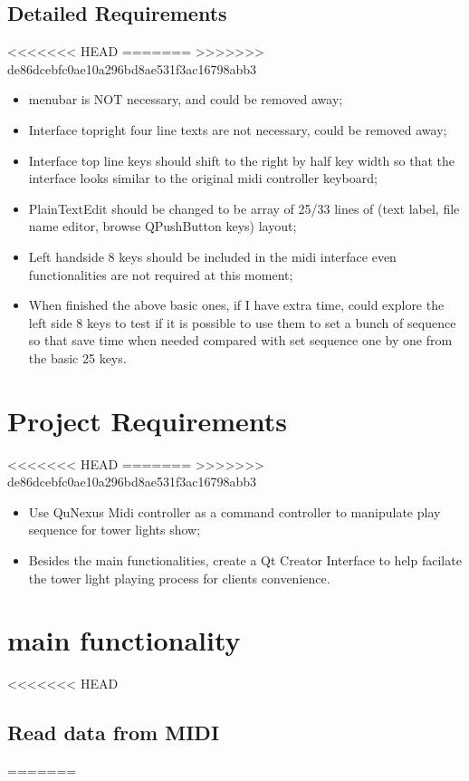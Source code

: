 \documentclass[9pt,b5paper]{article}
\begin{document}
\subsection{Detailed Requirements}
<<<<<<< HEAD
\label{sec-11-2}
=======
\label{sec-10-2}
>>>>>>> de86dcebfc0ae10a296bd8ae531f3ac16798abb3
\begin{itemize}
\item menubar is NOT necessary, and could be removed away;
\item Interface topright four line texts are not necessary, could be removed away;
\item Interface top line keys should shift to the right by half key width so that the interface looks similar to the original midi controller keyboard;
\item PlainTextEdit should be changed to be array of 25/33 lines of (text label, file name editor, browse QPushButton keys) layout;
\item Left handside 8 keys should be included in the midi interface even functionalities are not required at this moment;
\item When finished the above basic ones, if I have extra time, could explore the left side 8 keys to test if it is possible to use them to set a bunch of sequence so that save time when needed compared with set sequence one by one from the basic 25 keys.
\end{itemize}
\section{Project Requirements}
<<<<<<< HEAD
\label{sec-12}
=======
\label{sec-11}
>>>>>>> de86dcebfc0ae10a296bd8ae531f3ac16798abb3
\begin{itemize}
\item Use QuNexus Midi controller as a command controller to manipulate play sequence for tower lights show;
\item Besides the main functionalities, create a Qt Creator Interface to help facilate the tower light playing process for clients convenience.
\end{itemize}
\section{main functionality}
<<<<<<< HEAD
\label{sec-13}
\subsection{Read data from MIDI}
\label{sec-13-1}
=======
\label{sec-12}
\end{document}
